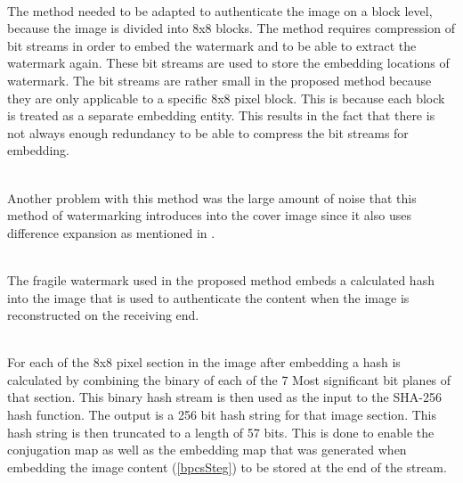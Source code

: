 \documentclass[12pt]{article}
\begin{document}
\hspace{0pt} \\
The method needed to be adapted to authenticate the image on a block level, because the image is divided into 8x8 blocks.
The method requires compression of bit streams in order to embed the watermark and to be able to extract the watermark again.
These bit streams are used to store the embedding locations of watermark.
The bit streams are rather small in the proposed method because they are only applicable to a specific 8x8 pixel block. 
This is because each block is treated as a separate embedding entity.
This results in the fact that there is not always enough redundancy to be able to compress the bit streams for embedding.

\hspace{0pt} \\
Another problem with this method was the large amount of noise that this method of watermarking introduces into the cover image since it also uses difference expansion as mentioned in \cite{tian2002reversible}.

\hspace{0pt} \\
The fragile watermark used in the proposed method embeds a calculated hash into the image that is used to authenticate the content when the image is reconstructed on the receiving end.

\hspace{0pt} \\
For each of the 8x8 pixel section in the image after embedding a hash is calculated by combining the binary of each of the 7 Most significant bit planes of that section. This binary hash stream is then used as the input to the SHA-256 hash function.
The output is a 256 bit hash string for that image section.
This hash string is then truncated to a length of 57 bits.
This is done to enable the conjugation map as well as the embedding map that was generated when embedding the image content (\ref{bpcsSteg}) to be stored at the end of the stream.
\end{document}
